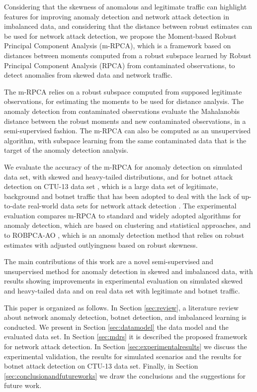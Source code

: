 \documentclass[review]{elsarticle}
\begin{document}
Considering that the skewness of anomalous and legitimate traffic can highlight features for improving anomaly detection and network attack detection in imbalanced data, and considering that the distance between robust estimates can be used for network attack detection, we propose the Moment-based Robust Principal Component Analysis (m-RPCA), which is a framework based on distances between moments computed from a robust subspace learned by Robust Principal Component Analysis (RPCA) from contaminated observations, to detect anomalies from skewed data and network traffic.

The m-RPCA relies on a robust subspace computed from supposed legitimate observations, for estimating the moments to be used for distance analysis. The anomaly detection from contaminated observations evaluate the Mahalanobis distance between the robust moments and new contaminated observations, in a semi-supervised fashion. The m-RPCA can also be computed as an unsupervised algorithm, with subspace learning from the same contaminated data that is the target of the anomaly detection analysis.

We evaluate the accuracy of the m-RPCA for anomaly detection on simulated data set, with skewed and heavy-tailed distributions, and for botnet attack detection on CTU-13 data set \cite{garcia2014empirical}, which is a large data set of legitimate, background and botnet traffic that has been adopted to deal with the lack of up-to-date real-world data sets for network attack detection \cite{osanaiye2016distributed}. The experimental evaluation compares m-RPCA to standard and widely adopted algorithms for anomaly detection, which are based on clustering and statistical approaches, and to ROBPCA-AO \cite{hubert2005robpca}, which is an anomaly detection method that relies on robust estimates with adjusted outlyingness based on robust skewness.

The main contributions of this work are a novel semi-supervised and unsupervised method for anomaly detection in skewed and imbalanced data, with results showing improvements in experimental evaluation on simulated skewed and heavy-tailed data and on real data set with legitimate and botnet traffic.

This paper is organized as follows. In Section \ref{sec:review}, a literature review about network anomaly detection, botnet detection, and imbalanced learning is conducted. We present in Section \ref{sec:datamodel} the data model and the evaluated data set. In Section \ref{sec:mdrs} it is described the proposed framework for network attack detection. In Section \ref{sec:experimentalresults} we discuss the experimental validation, the results for simulated scenarios and the results for botnet attack detection on CTU-13 data set. Finally, in Section \ref{sec:conclusionandfutureworks} we draw the conclusions and the suggestions for future work.
\end{document}
